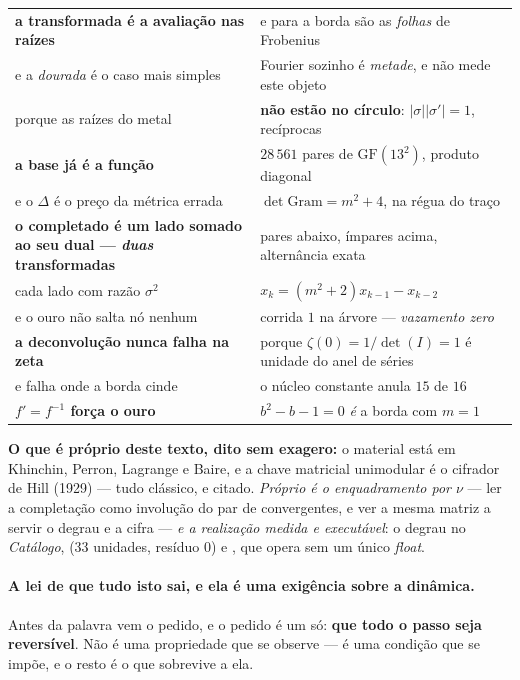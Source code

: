 \documentclass[livro.tex]{subfiles}
\begin{document}
\begin{mdframed}[linewidth=0.4pt,innerleftmargin=10pt,innerrightmargin=10pt,
                 innertopmargin=8pt,innerbottommargin=8pt,skipabove=6pt,skipbelow=6pt]
{\small
\begin{longtable}{@{}p{}p{}@{}}
\hline
\textbf{a transformada é a avaliação nas raízes} & e para a borda são as \emph{folhas} de Frobenius \\
\quad e a \emph{dourada} é o caso mais simples & Fourier sozinho é \emph{metade}, e não mede este objeto \\
\quad porque as raízes do metal & \textbf{não estão no círculo}: $|\sigma||\sigma'|=1$, recíprocas \\[2pt]
\textbf{a base já é a função} & $28\,561$ pares de $\mathrm{GF}(13^2)$, produto diagonal \\
\quad e o $\Delta$ é o preço da métrica errada & $\det\mathrm{Gram}=m^2+4$, na régua do traço \\[2pt]
\textbf{o completado é um lado somado ao seu dual --- \emph{duas} transformadas} & pares abaixo, ímpares acima, alternância exata \\
\quad cada lado com razão $\sigma^2$ & $x_k = (m^2{+}2)x_{k-1}-x_{k-2}$ \\
\quad e o ouro não salta nó nenhum & corrida $1$ na árvore --- \emph{vazamento zero} \\[2pt]
\textbf{a deconvolução nunca falha na zeta} & porque $\zeta(0)=1/\det(I)=1$ é unidade do anel de séries \\
\quad e falha onde a borda cinde & o núcleo constante anula $15$ de $16$ \\[2pt]
\textbf{$f'=f^{-1}$ força o ouro} & $b^2-b-1=0$ \emph{é} a borda com $m=1$ \\
\hline
\end{longtable}}

\medskip
\noindent \textbf{O que é próprio deste texto, dito sem exagero:} o material está em Khinchin,
Perron, Lagrange e Baire, e a chave matricial unimodular é o cifrador de Hill (1929) --- tudo
clássico, e citado. \emph{Próprio é o enquadramento por $\nu$} --- ler a completação como involução do
par de convergentes, e ver a mesma matriz a servir o degrau e a cifra --- \emph{e a realização
medida e executável}: o degrau no \emph{Catálogo},  ($33$ unidades, resíduo $0$)
e , que opera sem um único \emph{float}.
\medskip
\end{mdframed}

\paragraph{A lei de que tudo isto sai, e ela é uma exigência sobre a dinâmica.} Antes da
palavra vem o pedido, e o pedido é um só: \textbf{que todo o passo seja reversível}. Não é uma
propriedade que se observe --- é uma condição que se impõe, e o resto é o que sobrevive a ela.
\end{document}
